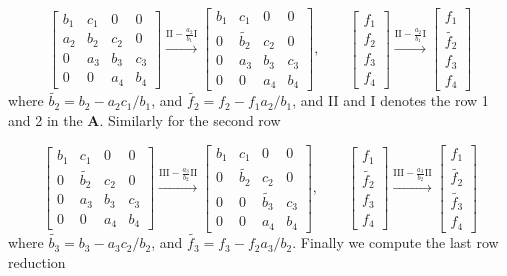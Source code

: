 \documentclass[a4paper,10pt]{article}
\begin{document}
\[
\begin{bmatrix}
b_1 & c_1 & 0 & 0 \\
a_2& b_2 & c_2 & 0 \\
0 & a_3 & b_3 & c_3 \\
0 & 0 & a_4 & b_4 
\end{bmatrix}
\xrightarrow{\text{II} - \frac{a_2}{b_1}\text{I}}
\begin{bmatrix}
b_1 & c_1 & 0 & 0 \\
0& \tilde{b_2}  & c_2 & 0 \\
0 & a_3 & b_3 & c_3 \\
0 & 0 & a_4 & b_4 
\end{bmatrix}, \qquad
\begin{bmatrix}
f_1\\
f_2\\
f_3\\
f_4
\end{bmatrix}
\xrightarrow{\text{II} - \frac{a_2}{b_1}\text{I}}
\begin{bmatrix}
f_1\\
\tilde{f_2}\\
f_3\\
f_4
\end{bmatrix}
\]
where $\tilde{b_2} = b_2 - a_2c_1/b_1$, and $\tilde{f_2} = f_2 - f_1a_2/b_1$, and II and I denotes the row 1 and 2 in the \textbf{A}. Similarly for the second row

\[
\begin{bmatrix}
b_1 & c_1 & 0 & 0 \\
0& \tilde{b_2}  & c_2 & 0 \\
0 & a_3 & b_3 & c_3 \\
0 & 0 & a_4 & b_4 
\end{bmatrix}
\xrightarrow{\text{III} - \frac{a_3}{b_2}\text{II}}
\begin{bmatrix}
b_1 & c_1 & 0 & 0 \\
0& \tilde{b_2}  & c_2 & 0 \\
0 & 0 & \tilde{b_3} & c_3 \\
0 & 0 & a_4 & b_4 
\end{bmatrix}, \qquad
\begin{bmatrix}
f_1\\
\tilde{f_2}\\
f_3\\
f_4
\end{bmatrix}
\xrightarrow{\text{III} - \frac{a_3}{b_2}\text{II}}
\begin{bmatrix}
f_1\\
\tilde{f_2}\\
\tilde{f_3}\\
f_4
\end{bmatrix}
\]
where $\tilde{b_3} = b_3 - a_3c_2/b_2$, and $\tilde{f_3} = f_3 - f_2a_3/b_2$. Finally we compute the last row reduction
\end{document}
